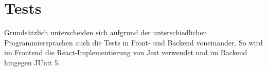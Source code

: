 \section{Tests}
Grundsätzlich unterscheiden sich aufgrund der unterschiedlichen Programmiersprachen auch die Tests in Front- und Backend voneinander.
So wird im Frontend die React-Implementierung von Jest verwendet und im Backend hingegen JUnit 5.


